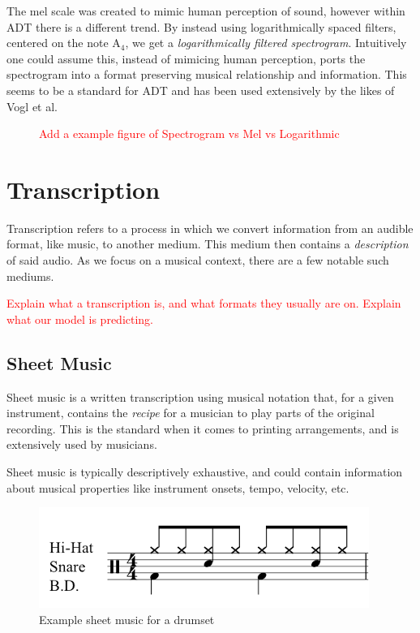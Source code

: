 The mel scale was created to mimic human perception of sound, however within \gls{ADT} there is a different trend. By instead using logarithmically spaced filters, centered on the note $\text{A}_4$, we get a \textit{logarithmically filtered spectrogram}. Intuitively one could assume this, instead of mimicing human perception, ports the spectrogram into a format preserving musical relationship and information. This seems to be a standard for \gls{ADT} and has been used extensively by the likes of Vogl et al.~\cite{8350302, vogl2018multiinstrumentdrumtranscription, Vogl2017DrumTV, signals4040042}

\begin{figure}[H]
    \centering
    \textcolor{red}{Add a example figure of Spectrogram vs Mel vs Logarithmic}
\end{figure}

\section{Transcription}

Transcription refers to a process in which we convert information from an audible format, like music, to another medium. This medium then contains a \textit{description} of said audio. As we focus on a musical context, there are a few notable such mediums.

\textcolor{red}{Explain what a transcription is, and what formats they usually are on. Explain what our model is predicting.}

\subsection{Sheet Music}

Sheet music is a written transcription using musical notation that, for a given instrument, contains the \textit{recipe} for a musician to play parts of the original recording. This is the standard when it comes to printing arrangements, and is extensively used by musicians.

Sheet music is typically descriptively exhaustive, and could contain information about musical properties like instrument onsets, tempo, velocity, etc. 

\begin{figure}[H]
    \centering
    \includegraphics[scale=1.0]{figures/drumsheet}
    \caption{Example sheet music for a drumset}
    \label{DrumsheetFigure}
\end{figure}

